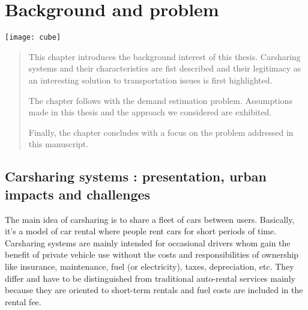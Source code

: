 \chapter{Background and problem} \label{chap:backAndPb} %
\begin{bibunit}[ieeetr]
\minitoc
\vspace{2cm}
%
\noindent
\begin{minipage}[c]{0.3\textwidth}
\texttt{[image: cube]}
\end{minipage}
\hfill
\begin{minipage}[c]{0.7\textwidth}
\begin{abstract}
This chapter introduces the background interest of this thesis.
Carsharing systems and their characteristics are fist described and their legitimacy as an interesting solution to transportation issues is first highlighted.

The chapter follows with the demand estimation problem.
Assumptions made in this thesis and the approach we considered are exhibited.

Finally, the chapter concludes with a focus on the problem addressed in this manuscript.
\end{abstract}
\end{minipage}


\newpage
\section{Carsharing systems : presentation, urban impacts and challenges} \label{sec:carsharingSystems}


The main idea of carsharing is to share a fleet of cars between users.
Basically, it's a model of car rental where people rent cars for short periods of time.
Carsharing systems are mainly intended for occasional drivers whom gain the benefit of private vehicle use without the costs and responsibilities of ownership \cite{shaheen_carsharing_1998} like insurance, maintenance, fuel (or electricity), taxes, depreciation, etc.
They differ and have to be distinguished from traditional auto-rental services mainly because they are oriented to short-term rentals and fuel costs are included in the rental fee.


\end{bibunit}
